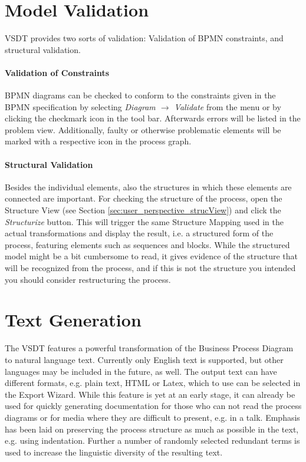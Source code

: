 \section{Model Validation}
\label{sec:user_features_validate}

VSDT provides two sorts of validation: Validation of BPMN constraints, and
structural validation.

\paragraph{Validation of Constraints}
BPMN diagrams can be checked to conform to the constraints given in the BPMN
specification by selecting \emph{Diagram $\rightarrow$ Validate} from the menu or
by clicking the checkmark icon in the tool bar.  Afterwards errors will be listed
in the problem view.  Additionally, faulty or otherwise problematic elements will
be marked with a respective icon in the process graph.

\paragraph{Structural Validation}
Besides the individual elements, also the structures in which these elements are
connected are important.  For checking the structure of the process, open the
Structure View (see Section \ref{sec:user_perspective_strucView}) and click the
\emph{Structurize} button.  This will trigger the same Structure Mapping used in
the actual transformations and display the result, i.e. a structured form of the
process, featuring elements such as sequences and blocks.  While the structured
model might be a bit cumbersome to read, it gives evidence of the structure that
will be recognized from the process, and if this is not the structure you intended
you should consider restructuring the process.


\section{Text Generation}
\label{sec:user_features_text}
 
The VSDT features a powerful transformation of the Business Process Diagram to
natural language text.  Currently only English text is supported, but other
languages may be included in the future, as well.  The output text can have
different formats, e.g. plain text, HTML or Latex, which to use can be selected
in the Export Wizard.  While this feature is yet at an early stage, it can already
be used for quickly generating documentation for those who can not read the
process diagrams or for media where they are difficult to present, e.g. in a talk.
Emphasis has been laid on preserving the process structure as much as possible in
the text, e.g. using indentation.  Further a number of randomly selected redundant
terms is used to increase the linguistic diversity of the resulting text.


